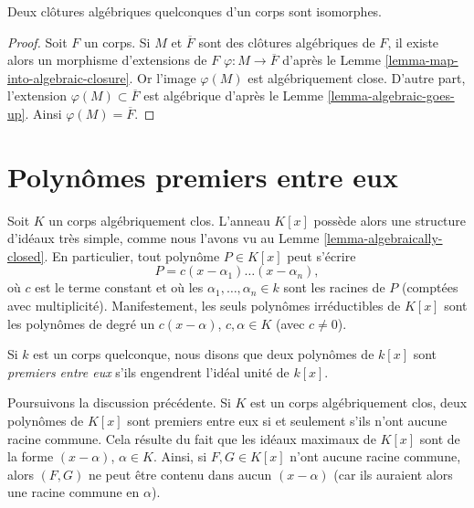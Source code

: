 \begin{lemma}
\label{lemma-algebraic-closures-isomorphic}
Deux clôtures algébriques quelconques d'un corps sont isomorphes.
\end{lemma}

\begin{proof}
Soit $F$ un corps. Si $M$ et $\overline{F}$ sont des clôtures algébriques de
$F$, il existe alors un morphisme d'extensions de $F$
$\varphi : M \to \overline{F}$ d'après le
Lemme \ref{lemma-map-into-algebraic-closure}.
Or l'image $\varphi(M)$ est algébriquement close.
D'autre part, l'extension $\varphi(M) \subset \overline{F}$
est algébrique d'après le Lemme \ref{lemma-algebraic-goes-up}.
Ainsi $\varphi(M) = \overline{F}$.
\end{proof}





\section{Polynômes premiers entre eux}
\label{section-relatively-prime}

\noindent
Soit $K$ un corps algébriquement clos. L'anneau $K[x]$ possède alors une structure
d'idéaux très simple, comme nous l'avons vu au Lemme \ref{lemma-algebraically-closed}.
En particulier, tout polynôme $P \in K[x]$ peut s'écrire
$$
P = c(x - \alpha_1) \ldots (x - \alpha_n),
$$
où $c$ est le terme constant et où les $\alpha_1, \ldots, \alpha_n \in k$
sont les racines de $P$ (comptées avec multiplicité). Manifestement, les seuls polynômes
irréductibles de $K[x]$ sont les polynômes de degré un $c(x - \alpha)$,
$c, \alpha \in K$ (avec $c \neq 0$).

\begin{definition}
\label{definition-relatively-prime}
Si $k$ est un corps quelconque, nous disons que deux polynômes de $k[x]$ sont
{\it premiers entre eux} s'ils engendrent l'idéal unité de $k[x]$.
\end{definition}

\noindent
Poursuivons la discussion précédente. Si $K$ est un corps algébriquement clos,
deux polynômes de $K[x]$ sont premiers entre eux si et seulement s'ils n'ont aucune
racine commune. Cela résulte du fait que les idéaux maximaux de $K[x]$ sont de la forme
$(x - \alpha)$, $\alpha \in K$. Ainsi, si $F, G \in K[x]$ n'ont aucune racine commune,
alors $(F, G)$ ne peut être contenu dans aucun $(x - \alpha)$ (car ils auraient alors
une racine commune en $\alpha$).

